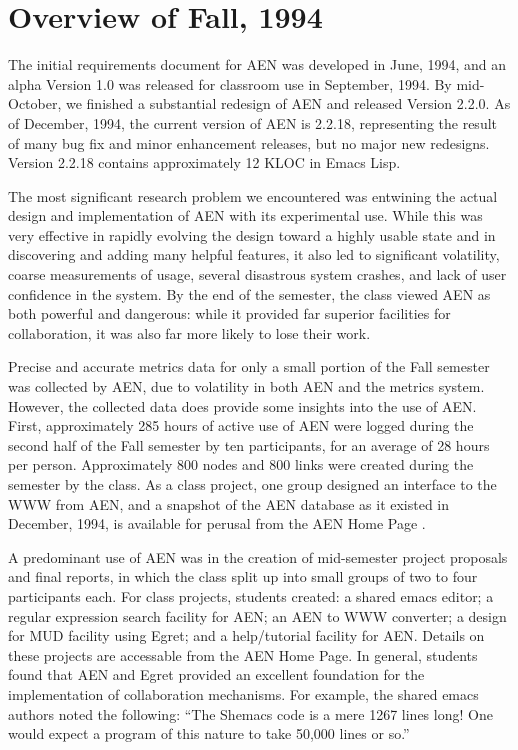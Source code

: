 \section{Overview of Fall, 1994}

The initial requirements document for AEN \cite{csdl-94-06} was developed
in June, 1994, and an alpha Version 1.0 was released for classroom use in
September, 1994.  By mid-October, we finished a substantial redesign of AEN
and released Version 2.2.0.  As of December, 1994, the current version of
AEN is 2.2.18, representing the result of many bug fix and minor
enhancement releases, but no major new redesigns. Version 2.2.18 contains
approximately 12 KLOC in Emacs Lisp.

The most significant research problem we encountered was entwining the
actual design and implementation of AEN with its experimental use. While
this was very effective in rapidly evolving the design toward a highly
usable state and in discovering and adding many helpful features, it also
led to significant volatility, coarse measurements of usage, several
disastrous system crashes, and lack of user confidence in the system.  By
the end of the semester, the class viewed AEN as both powerful and
dangerous: while it provided far superior facilities for collaboration, it
was also far more likely to lose their work.  

Precise and accurate metrics data for only a small portion of the Fall
semester was collected by AEN, due to volatility in both AEN and the metrics
system.  However, the collected data does provide some insights into the
use of AEN.  First, approximately 285 hours of active use of AEN were
logged during the second half of the Fall semester by ten participants, for
an average of 28 hours per person.  Approximately 800 nodes and 800 links
were created during the semester by the class.  As a class project, one
group designed an interface to the WWW from AEN, and a snapshot of the AEN
database as it existed in December, 1994, is available for perusal from
the AEN Home Page \cite{csdl-www-aen}.

A predominant use of AEN was in the creation of mid-semester project
proposals and final reports, in which the class split up into small groups
of two to four participants each.  For class projects, students created: a
shared emacs editor; a regular expression search facility for AEN; an AEN
to WWW converter; a design for MUD facility using Egret; and a
help/tutorial facility for AEN.  Details on these projects are accessable
from the AEN Home Page.  In general, students found that AEN and Egret
provided an excellent foundation for the implementation of collaboration
mechanisms. For example, the shared emacs authors noted the following:
``The Shemacs code is a mere 1267 lines long!  One would expect a program
of this nature to take 50,000 lines or so.''

